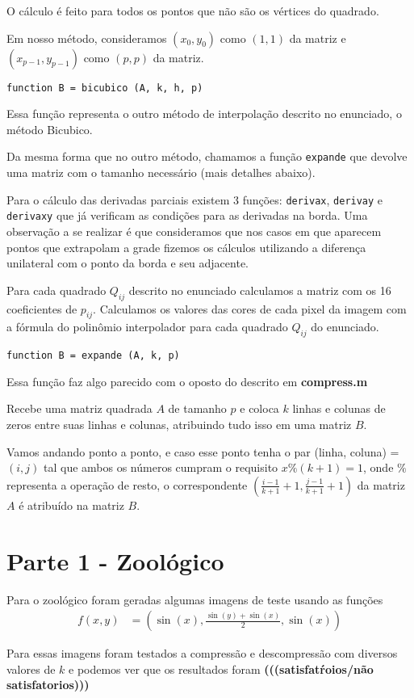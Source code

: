 \documentclass[12pt,letterpaper]{article}
\begin{document}
        O cálculo é feito para todos os pontos que não são os vértices do quadrado.

        Em nosso método, consideramos $(x_0, y_0)$ como $(1, 1)$ da matriz e $(x_{p-1}, y_{p-1})$ como $(p, p)$ da matriz.

        \begin{center}
            \texttt{function B = bicubico (A, k, h, p)}
        \end{center}

        Essa função representa o outro método de interpolação descrito no enunciado, o método Bicubico.

        Da mesma forma que no outro método, chamamos a função \texttt{expande} que devolve uma matriz com o tamanho necessário (mais detalhes abaixo).

        Para o cálculo das derivadas parciais existem 3 funções: \texttt{derivax}, \texttt{derivay} e \texttt{derivaxy} que já verificam as condições para as derivadas na borda. Uma observação a se realizar é que consideramos que nos casos em que aparecem pontos que extrapolam a grade fizemos os cálculos utilizando a diferença unilateral com o ponto da borda e seu adjacente.

        Para cada quadrado $Q_{ij}$ descrito no enunciado calculamos a matriz com os 16 coeficientes de $p_{ij}$. Calculamos os valores das cores de cada pixel da imagem com a fórmula do polinômio interpolador para cada quadrado $Q_{ij}$ do enunciado.

        \begin{center}
            \texttt{function B = expande (A, k, p)}
        \end{center}

        Essa função faz algo parecido com o oposto do descrito em \textbf{compress.m}

        Recebe uma matriz quadrada $A$ de tamanho $p$ e coloca $k$ linhas e colunas de zeros entre suas linhas e colunas, atribuindo tudo isso em uma matriz $B$.

        Vamos andando ponto a ponto, e caso esse ponto tenha o par (linha, coluna) = $(i, j)$ tal que ambos os números cumpram o requisito $x\%(k+1)=1$, onde $\%$ representa a operação de resto, o correspondente $(\frac{i-1}{k+1}+1, \frac{j-1}{k+1}+1)$ da matriz $A$ é atribuído na matriz $B$.


    \section{Parte 1 - Zoológico}
        Para o zoológico foram geradas algumas imagens de teste usando as funções
        \begin{align*}
            f(x,y) &= \left(\sin(x), \frac{\sin(y) + \sin(x)}{2}, \sin(x)\right)
        \end{align*}

        Para essas imagens foram testados a compressão e descompressão com diversos
        valores de $k$ e podemos ver que os resultados foram \textbf{(((satisfatŕoios/não satisfatorios)))}

        
\end{document}
